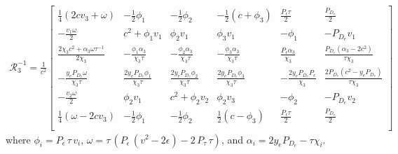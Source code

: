 \begin{align*}
  \mathcal{R}_{3}^{-1} = \frac{1}{c^2}
  \left[
  \begin{array}{cccccc}
   \frac{1}{4} (2 c v_{3}+\omega ) & -\frac{1}{2} \phi_{1} & -\frac{1}{2} \phi_{2}
    & -\frac{1}{2}(c+\phi_{3})  & \frac{P_{\epsilon} \tau }{2} & \frac{P_{D_{e}}}{2}
     \\
   -\frac{v_{1} \omega }{2} & c^2 + \phi_{1} v_{1}  & \phi_{2} v_{1}  &
     \phi_{3} v_{1}  & -\phi_{1}  & -P_{D_{e}} v_{1}
     \\
   \frac{2 \chi_{3}  c^2+\alpha_{3}  \omega \tau^{-1} }{2 \chi_{3} } & -\frac{\phi_{1} \alpha_{3}  }{\chi_{3} \tau } &
     -\frac{\phi_{2} \alpha_{3}  }{\chi_{3} \tau } & -\frac{\phi_{3} \alpha_{3} }{\chi_{3} \tau } &
     \frac{P_{\epsilon} \alpha_{3} }{\chi_{3} } & \frac{P_{D_{e}} \left(\alpha_{3} -2 c^2\right)}{\tau \chi_{3} }
      \\
   -\frac{y_{e} P_{D_{e}} \omega }{\chi_{3} \tau } & \frac{2 y_{e} P_{D_{e}} \phi_{1} }{\chi_{3} \tau } & \frac{2 y_{e} P_{D_{e}}
     \phi_{2} }{\chi_{3} \tau} & \frac{2 y_{e} P_{D_{e}} \phi_{3} }{\chi_{3} \tau} & -\frac{2 y_{e}
     P_{D_{e}} P_{\epsilon} }{\chi_{3} } & \frac{2 P_{D_{e}} \left(c^2-y_{e} P_{D_{e}} \right)}{\tau \chi_{3} }
      \\
   -\frac{v_{2} \omega }{2} & \phi_{2} v_{1}  & c^2+\phi_{2} v_{2}   &
     \phi_{2} v_{3}  & -\phi_{2}  & -P_{D_{e}} v_{2}
      \\
   \frac{1}{4} (\omega -2 c  v_{3}) & -\frac{1}{2} \phi_{1}  & -\frac{1}{2} \phi_{2}
       & \frac{1}{2} (c-\phi_{3})  & \frac{P_{\epsilon} \tau }{2} & \frac{P_{D_{e}}}{2}
     \\
  \end{array}
  \right]
\end{align*}
where $\phi_{i} = P_{\epsilon}\,\tau\, v_{i}$,
$\omega = \tau\, (P_{\epsilon}\,(v^2 - 2\epsilon) - 2\,P_{\tau}\,\tau)$, and
$\alpha_{i} = 2 y_{e} P_{D_{e}} - \tau \chi_{i}$.


